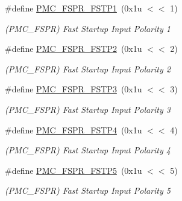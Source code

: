 \begin{DoxyCompactItemize}
\mbox{\label{group__SAMV71__PMC_ga8e7974990c3071500c1e5fab42781591}} 
\#define \mbox{\hyperlink{group__SAMV71__PMC_ga8e7974990c3071500c1e5fab42781591}{P\+M\+C\+\_\+\+F\+S\+P\+R\+\_\+\+F\+S\+T\+P1}}~(0x1u $<$$<$ 1)
\begin{DoxyCompactList}\small\item\em (P\+M\+C\+\_\+\+F\+S\+PR) Fast Startup Input Polarity 1 \end{DoxyCompactList}\item 
\mbox{\label{group__SAMV71__PMC_gaf932ab6bc83c9041e57bf1670f477385}} 
\#define \mbox{\hyperlink{group__SAMV71__PMC_gaf932ab6bc83c9041e57bf1670f477385}{P\+M\+C\+\_\+\+F\+S\+P\+R\+\_\+\+F\+S\+T\+P2}}~(0x1u $<$$<$ 2)
\begin{DoxyCompactList}\small\item\em (P\+M\+C\+\_\+\+F\+S\+PR) Fast Startup Input Polarity 2 \end{DoxyCompactList}\item 
\mbox{\label{group__SAMV71__PMC_ga1d8ee2db1a6fdb081cb43a505f13f69e}} 
\#define \mbox{\hyperlink{group__SAMV71__PMC_ga1d8ee2db1a6fdb081cb43a505f13f69e}{P\+M\+C\+\_\+\+F\+S\+P\+R\+\_\+\+F\+S\+T\+P3}}~(0x1u $<$$<$ 3)
\begin{DoxyCompactList}\small\item\em (P\+M\+C\+\_\+\+F\+S\+PR) Fast Startup Input Polarity 3 \end{DoxyCompactList}\item 
\mbox{\label{group__SAMV71__PMC_gace394bf7a6669894004a5686b22314ee}} 
\#define \mbox{\hyperlink{group__SAMV71__PMC_gace394bf7a6669894004a5686b22314ee}{P\+M\+C\+\_\+\+F\+S\+P\+R\+\_\+\+F\+S\+T\+P4}}~(0x1u $<$$<$ 4)
\begin{DoxyCompactList}\small\item\em (P\+M\+C\+\_\+\+F\+S\+PR) Fast Startup Input Polarity 4 \end{DoxyCompactList}\item 
\mbox{\label{group__SAMV71__PMC_gafe90d4e41210a882dd735eb1805cc6ca}} 
\#define \mbox{\hyperlink{group__SAMV71__PMC_gafe90d4e41210a882dd735eb1805cc6ca}{P\+M\+C\+\_\+\+F\+S\+P\+R\+\_\+\+F\+S\+T\+P5}}~(0x1u $<$$<$ 5)
\begin{DoxyCompactList}\small\item\em (P\+M\+C\+\_\+\+F\+S\+PR) Fast Startup Input Polarity 5 \end{DoxyCompactList}\item 
$$
\end{DoxyCompactItemize}
